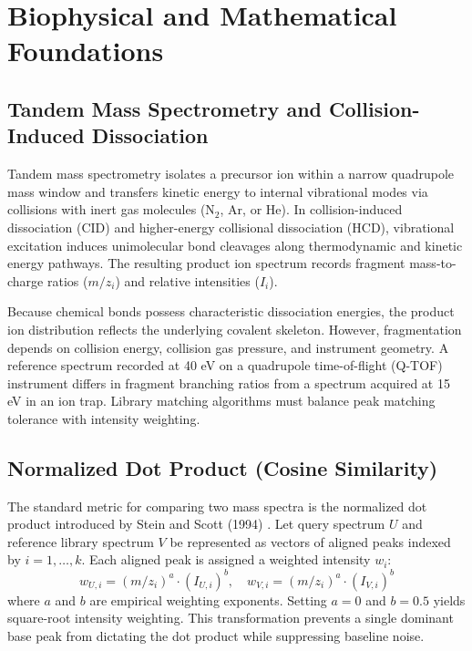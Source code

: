 \documentclass[11pt,twoside,openright]{book}
\begin{document}
\section{Biophysical and Mathematical Foundations}

\subsection{Tandem Mass Spectrometry and Collision-Induced Dissociation}
Tandem mass spectrometry isolates a precursor ion within a narrow quadrupole mass window and transfers kinetic energy to internal vibrational modes via collisions with inert gas molecules ($\text{N}_2$, $\text{Ar}$, or $\text{He}$). In collision-induced dissociation (CID) and higher-energy collisional dissociation (HCD), vibrational excitation induces unimolecular bond cleavages along thermodynamic and kinetic energy pathways. The resulting product ion spectrum records fragment mass-to-charge ratios ($m/z_i$) and relative intensities ($I_i$).

Because chemical bonds possess characteristic dissociation energies, the product ion distribution reflects the underlying covalent skeleton. However, fragmentation depends on collision energy, collision gas pressure, and instrument geometry. A reference spectrum recorded at 40 eV on a quadrupole time-of-flight (Q-TOF) instrument differs in fragment branching ratios from a spectrum acquired at 15 eV in an ion trap. Library matching algorithms must balance peak matching tolerance with intensity weighting.

\subsection{Normalized Dot Product (Cosine Similarity)}
The standard metric for comparing two mass spectra is the normalized dot product introduced by Stein and Scott (1994) \cite{stein1994optimization}. Let query spectrum $U$ and reference library spectrum $V$ be represented as vectors of aligned peaks indexed by $i = 1, \dots, k$. Each aligned peak is assigned a weighted intensity $w_i$:
\begin{equation}
w_{U, i} = (m/z_i)^a \cdot (I_{U, i})^b, \quad w_{V, i} = (m/z_i)^a \cdot (I_{V, i})^b
\label{eq:stein_weights}
\end{equation}
where $a$ and $b$ are empirical weighting exponents. Setting $a = 0$ and $b = 0.5$ yields square-root intensity weighting. This transformation prevents a single dominant base peak from dictating the dot product while suppressing baseline noise.
\end{document}
